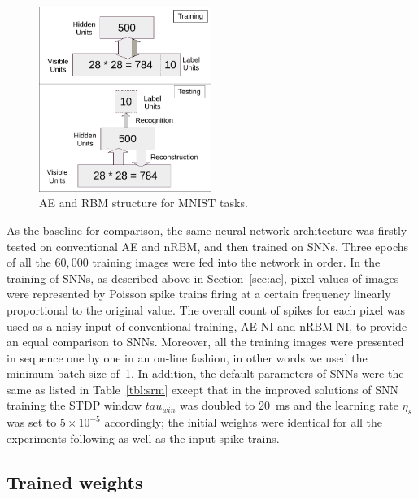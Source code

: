 \begin{figure}
	\centering
	\includegraphics[width=0.5\textwidth]{pics_sdlm/mnist.pdf}
	\caption{AE and RBM structure for MNIST tasks.}
	\label{fig:MNSIT}
\end{figure}

As the baseline for comparison, the same neural network architecture was firstly tested on conventional AE and nRBM, and then trained on SNNs.
Three epochs of all the $60,000$ training images were fed into the network in order.
In the training of SNNs, as described above in Section~\ref{sec:ae}, pixel values of images were represented by Poisson spike trains firing at a certain frequency linearly proportional to the original value.
The overall count of spikes for each pixel was used as a noisy input of conventional training, AE-NI and nRBM-NI, to provide an equal comparison to SNNs.
Moreover, all the training images were presented in sequence one by one in an on-line fashion, in other words we used the minimum batch size of~1.
In addition, the default parameters of SNNs were the same as listed in Table~\ref{tbl:srm} except that in the improved solutions of SNN training the STDP window $tau_{win}$ was doubled to 20~ms and the learning rate $\eta_s$ was set to $5 \times 10^{-5}$ accordingly;
the initial weights were identical for all the experiments following as well as the input spike trains.


\subsection{Trained weights}

